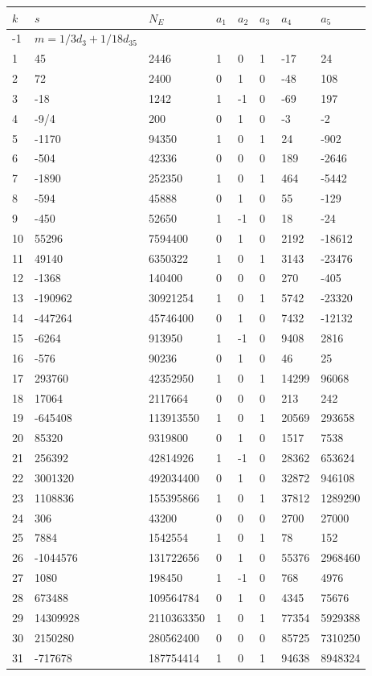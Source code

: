 \documentclass{amsart}
\begin{document}
\begin{longtable}{|l|l|l|lllll|}
\hline
$k$ & $s$ & $N_E$ & $a_1$ & $a_2$ & $a_3$ & $a_4$ & $a_5$\\
\hline
-1&$m=1/3d_{3}+1/18d_{35}$&&\multicolumn{5}{c|}{}\\
1&45&2446&1&0&1&-17&24\\
2&72&2400&0&1&0&-48&108\\
3&-18&1242&1&-1&0&-69&197\\
4&-9/4&200&0&1&0&-3&-2\\
5&-1170&94350&1&0&1&24&-902\\
6&-504&42336&0&0&0&189&-2646\\
7&-1890&252350&1&0&1&464&-5442\\
8&-594&45888&0&1&0&55&-129\\
9&-450&52650&1&-1&0&18&-24\\
10&55296&7594400&0&1&0&2192&-18612\\
11&49140&6350322&1&0&1&3143&-23476\\
12&-1368&140400&0&0&0&270&-405\\
13&-190962&30921254&1&0&1&5742&-23320\\
14&-447264&45746400&0&1&0&7432&-12132\\
15&-6264&913950&1&-1&0&9408&2816\\
16&-576&90236&0&1&0&46&25\\
17&293760&42352950&1&0&1&14299&96068\\
18&17064&2117664&0&0&0&213&242\\
19&-645408&113913550&1&0&1&20569&293658\\
20&85320&9319800&0&1&0&1517&7538\\
21&256392&42814926&1&-1&0&28362&653624\\
22&3001320&492034400&0&1&0&32872&946108\\
23&1108836&155395866&1&0&1&37812&1289290\\
24&306&43200&0&0&0&2700&27000\\
25&7884&1542554&1&0&1&78&152\\
26&-1044576&131722656&0&1&0&55376&2968460\\
27&1080&198450&1&-1&0&768&4976\\
28&673488&109564784&0&1&0&4345&75676\\
29&14309928&2110363350&1&0&1&77354&5929388\\
30&2150280&280562400&0&0&0&85725&7310250\\
31&-717678&187754414&1&0&1&94638&8948324\\

\end{longtable}
\end{document}
